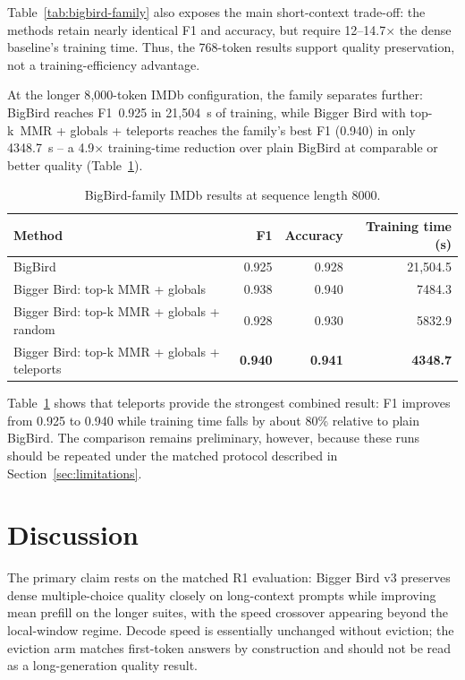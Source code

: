 \documentclass[11pt]{article}
\begin{document}
Table~\ref{tab:bigbird-family} also exposes the main short-context trade-off:
the methods retain nearly identical F1 and accuracy, but require
12--14.7$\times$ the dense baseline's training time. Thus, the 768-token
results support quality preservation, not a training-efficiency advantage.

At the longer 8{,}000-token IMDb configuration, the family separates further:
BigBird reaches F1~0.925 in 21{,}504~s of training, while Bigger Bird with
top-k~MMR + globals + teleports reaches the family's best F1 (0.940) in only
4348.7~s -- a 4.9$\times$ training-time reduction over plain BigBird at
comparable or better quality (Table~\ref{tab:bigbird-8000}).

\begin{table}[ht]
  \centering
  \small
  \caption{BigBird-family IMDb results at sequence length 8000.}
  \label{tab:bigbird-8000}
  \begin{tabular}{@{}lrrr@{}}
    \toprule
    Method & F1 & Accuracy & Training time (s) \\
    \midrule
    BigBird & 0.925 & 0.928 & 21{,}504.5 \\
    Bigger Bird: top-k MMR + globals & 0.938 & 0.940 & 7484.3 \\
    Bigger Bird: top-k MMR + globals + random & 0.928 & 0.930 & 5832.9 \\
    Bigger Bird: top-k MMR + globals + teleports & \textbf{0.940} & \textbf{0.941} & \textbf{4348.7} \\
    \bottomrule
  \end{tabular}
\end{table}

Table~\ref{tab:bigbird-8000} shows that teleports provide the strongest
combined result: F1 improves from 0.925 to 0.940 while training time falls by
about 80\% relative to plain BigBird. The comparison remains preliminary,
however, because these runs should be repeated under the matched protocol
described in Section~\ref{sec:limitations}.

\FloatBarrier
\section{Discussion}

The primary claim rests on the matched R1 evaluation: Bigger Bird v3 preserves
dense multiple-choice quality closely on long-context prompts while improving
mean prefill on the longer suites, with the speed crossover appearing beyond
the local-window regime. Decode speed is essentially unchanged without
eviction; the eviction arm matches first-token answers by construction and
should not be read as a long-generation quality result.
\end{document}
